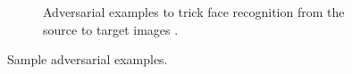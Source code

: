 \begin{figure}[p]
\begin{subfigure}[b]{0.8\linewidth}
    \caption{Adversarial examples to trick face recognition from the source to target images \citep{Wang:2018vl}.}
  \end{subfigure}

  \caption[Sample adversarial examples]{Sample adversarial examples.}
  \label{fig:background:software-quality:reliability-in-cv:adversarial-examples}
\end{figure}